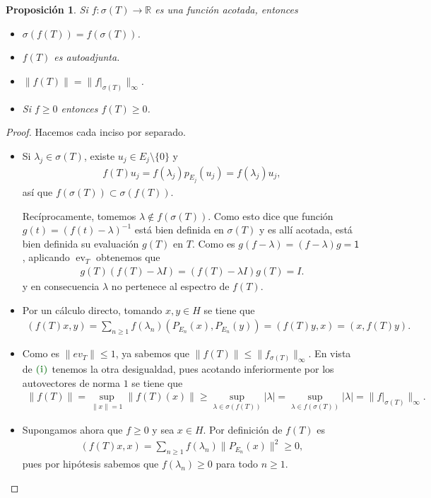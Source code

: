 \documentclass[11pt]{report}
\theoremstyle{colored}
\newtheorem{proposition}{Proposición}[section]
\newcommand{\R}{\mathbb{R}}
\newcommand{\ev}{\operatorname{ev}}
\newcommand{\ip}[1]{( #1 )}
\newcommand{\paint}[1]{\color{color}{#1}}
\newcommand{\tpaint}[1]{\paint{\textbf{#1}}}
\begin{document}
\begin{proposition} Si $f : \sigma(T) \to \R$ es una función acotada, entonces
\begin{itemize}
\item[(i)] $\sigma(f(T)) = f(\sigma(T))$.
\item[(ii)] $f(T)$ es autoadjunta.
\item[(iii)] $\|f(T)\| = \|f|_{\sigma(T)}\|_{\infty}$.
\item[(iv)] Si $f \geq 0$ entonces $f(T) \geq 0$.
\end{itemize}
\end{proposition}
\begin{proof} Hacemos cada inciso por separado. 
\begin{itemize}[listparindent = \parindent]
\item[(i)] Si $\lambda_j \in \sigma(T)$, existe $u_j \in E_j \setminus \{0\}$ y
\begin{align*}
f(T)u_j = f(\lambda_j)p_{E_j}(u_j) = f(\lambda_j)u_j,
\end{align*}
así que $f(\sigma(T)) \subset \sigma(f(T))$. 

Recíprocamente, tomemos $\lambda \not \in f(\sigma(T))$. Como esto dice que función $g(t) = (f(t)-\lambda)^{-1}$ está bien definida en $\sigma(T)$ y es allí acotada, está bien definida su evaluación $g(T)$ en $T$. Como es $g(f-\lambda) = (f-\lambda)g = \mathsf{1}$, aplicando $\ev_T$ obtenemos que
\begin{align*}
g(T)(f(T)- \lambda I) = (f(T) - \lambda I)g(T) = I.
\end{align*}
y en consecuencia $\lambda$ no pertenece al espectro de $f(T)$.
\item[(ii)] Por un cálculo directo, tomando $x,y \in H$ se tiene que 
\begin{align*}
\ip{f(T)x, y} = \sum_{n \geq 1} f(\lambda_n)\ip{P_{E_n}(x),P_{E_n}(y)}  = \ip{f(T)y,x} = \ip{x, f(T)y}.
\end{align*}
\item[(iii)] Como es $\|ev_T\| \leq 1$, ya sabemos que $\|f(T)\| \leq \|f_{\sigma(T)}\|_\infty$. En vista de $\tpaint{(i)}$ tenemos la otra desigualdad, pues acotando inferiormente por los autovectores de norma $1$ se tiene que 
\begin{align*}
\|f(T)\| = \sup_{\|x\| = 1}\|f(T)(x)\| \geq \sup_{\lambda \in \sigma(f(T))}|\lambda| = \sup_{\lambda \in f(\sigma(T))}|\lambda| = \|f|_{\sigma(T)}\|_\infty.
\end{align*}
\item[(iv)] Supongamos ahora que $f \geq 0$ y sea $x \in H$. Por definición de $f(T)$ es 
\begin{align*}
(f(T)x,x) = \sum_{n \geq 1} f(\lambda_n)\|P_{E_n}(x)\|^2 \geq 0,
\end{align*}
pues por hipótesis sabemos que $f(\lambda_n) \geq 0$ para todo $n \geq 1$.
\end{itemize}
\end{proof}
\end{document}
